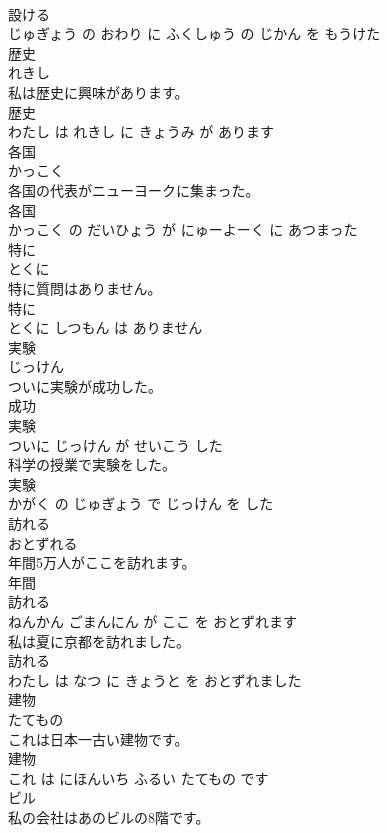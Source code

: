 \documentclass[8pt]{extreport}
\begin{document}
\begin{CJK}{UTF8}{min}
\\	設ける 
\\	じゅぎょう の おわり に ふくしゅう の じかん を もうけた			
\\	歴史	
\\	れきし			
\\	私は歴史に興味があります。	
\\	歴史 
\\	わたし は れきし に きょうみ が あります			
\\	各国	
\\	かっこく			
\\	各国の代表がニューヨークに集まった。	
\\	各国 
\\	かっこく の だいひょう が にゅーよーく に あつまった			
\\	特に	
\\	とくに			
\\	特に質問はありません。	
\\	特に 
\\	とくに しつもん は ありません			
\\	実験	
\\	じっけん			
\\	ついに実験が成功した。	
\\	成功 
\\	実験 
\\	ついに じっけん が せいこう した			
\\	科学の授業で実験をした。	
\\	実験 
\\	かがく の じゅぎょう で じっけん を した			
\\	訪れる	
\\	おとずれる			
\\	年間5万人がここを訪れます。	
\\	年間 
\\	訪れる 
\\	ねんかん ごまんにん が ここ を おとずれます			
\\	私は夏に京都を訪れました。	
\\	訪れる 
\\	わたし は なつ に きょうと を おとずれました			
\\	建物	
\\	たてもの			
\\	これは日本一古い建物です。	
\\	建物 
\\	これ は にほんいち ふるい たてもの です			
\\	ビル	
\\	私の会社はあのビルの8階です。	

\end{CJK}
\end{document}

